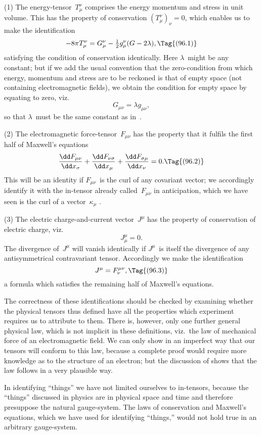 \documentclass[12pt]{book}
\begin{document}
(1) The energy\hyp{}tensor~$T_{\mu}^{\nu}$ comprises the energy momentum and stress in
unit volume. This has the property of conservation $(T_{\mu}^{\nu})_{\nu} = 0$, which enables
us to make the identification
\[
-8\pi T_{\mu}^{\nu} = G_{\mu}^{\nu} - \tfrac{1}{2} g_{\mu}^{\nu}(G - 2\lambda),
\Tag{(96.1)}
\]
satisfying the condition of conservation identically. Here $\lambda$~might be any
constant; but if we add the usual convention that the zero\hyp{}condition from
which energy, momentum and stress are to be reckoned is that of empty space
(not containing electromagnetic fields), we obtain the condition for empty
space by equating  to zero, viz.\
\[
G_{\mu\nu} = \lambda g_{\mu\nu},
\]
so that $\lambda$~must be the same constant as in~.

(2) The electromagnetic force\hyp{}tensor~$F_{\mu\nu}$ has the property that it fulfils
the first half of Maxwell's equations
\[
\frac{\dd F_{\mu\nu}}{\dd x_{\sigma}}
+ \frac{\dd F_{\nu\sigma}}{\dd x_{\mu}}
+ \frac{\dd F_{\sigma\mu}}{\dd x_{\nu}} = 0.
\Tag{(96.2)}
\]
This will be an identity if $F_{\mu\nu}$~is the curl of any covariant vector; we
accordingly identify it with the in\hyp{}tensor already called~$F_{\mu\nu}$ in anticipation,
which we have seen is the curl of a vector~$\kappa_{\mu}$ \Eq{(94.62)}.

(3) The electric charge\hyp{}and\hyp{}current vector~$J^{\mu}$ has the property of conservation
of electric charge, viz.\
\[
J_{\mu}^{\mu} = 0.
\]
The divergence of~$J^{\mu}$ will vanish identically if $J^{\mu}$~is itself the divergence of any
antisymmetrical contravariant tensor. Accordingly we make the identification
\[
J^{\mu} = F_{\nu}^{\mu\nu},
\Tag{(96.3)}
\]
a formula which satisfies the remaining half of Maxwell's equations.

The correctness of these identifications should be checked by examining
whether the physical tensors thus defined have all the properties which
experiment requires us to attribute to them. There is, however, only one
further general physical law, which is not implicit in these definitions, viz.\ the
law of mechanical force of an electromagnetic field. We can only show in an
imperfect way that our tensors will conform to this law, because a complete
proof would require more knowledge as to the structure of an electron; but
the discussion of \SecRef{80} shows that the law follows in a very plausible way.

In identifying ``things'' we have not limited ourselves to in\hyp{}tensors,
because the ``things'' discussed in physics are in physical space and time and
therefore presuppose the natural gauge\hyp{}system. The laws of conservation and
Maxwell's equations, which we have used for identifying ``things,'' would not
hold true in an arbitrary gauge\hyp{}system.
\end{document}
